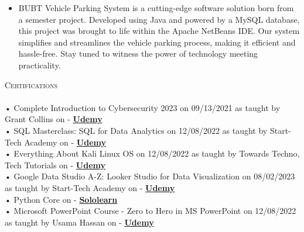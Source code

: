 \documentclass[a4paper]{article}
\newcommand{\lineunder} {
    \vspace*{-8pt} \\
    \hspace*{-18pt} \hrulefill \\
}
\newcommand{\header} [1] {
    {\hspace*{-18pt}\vspace*{9pt} \textsc{#1}}
    \vspace*{-9pt} \lineunder
}
\begin{document}
          \vspace{-3mm}
\begin{itemize} \itemsep -3pt
\item[] BUBT Vehicle Parking System is a cutting-edge software solution born from a semester project. Developed using Java and powered by a MySQL database, this project was brought to life within the Apache NetBeans IDE. Our system simplifies and streamlines the vehicle parking process, making it efficient and hassle-free. Stay tuned to witness the power of technology meeting practicality.
\end{itemize}
          \vspace*{3mm}
      \header{Certifications}
      \vspace{2mm}
      • Complete Introduction to Cybersecurity 2023 on 09/13/2021 as taught by Grant Collins on - \textbf{\href{https://www.udemy.com/certificate/UC-8e63cd79-afe7-4c1b-b342-1b8b4f7010f3/}{Udemy}}\\
\vspace*{1mm}
      • SQL Masterclass: SQL for Data Analytics on 12/08/2022 as taught by Start-Tech Academy on - \textbf{\href{https://www.udemy.com/certificate/UC-2f8d5423-8e8c-4726-aac4-5d0de06ab526/}{Udemy}}\\
\vspace*{1mm}
      • Everything About Kali Linux OS on 12/08/2022 as taught by Towards Techno, Tech Tutorials on - \textbf{\href{https://www.udemy.com/certificate/UC-6fa568e8-b553-4d1b-a7d0-8a919776d449/}{Udemy}}\\
\vspace*{1mm}
      • Google Data Studio A-Z: Looker Studio for Data Visualization on 08/02/2023 as taught by Start-Tech Academy on - \textbf{\href{https://www.udemy.com/certificate/UC-c7187344-687f-46ae-8ac8-6a9c58d84ace/}{Udemy}}\\
\vspace*{1mm}
      • Python Core on - \textbf{\href{https://www.sololearn.com/certificates/CT-BTRVSEDB}{Sololearn}}\\
\vspace*{1mm}
      • Microsoft PowerPoint Course - Zero to Hero in MS PowerPoint on 12/08/2022 as taught by Usama Hassan on - \textbf{\href{https://www.udemy.com/certificate/UC-c3679a40-51df-426b-8a05-631ac38542a9/}{Udemy}}\\
\vspace*{1mm}
\end{document}
